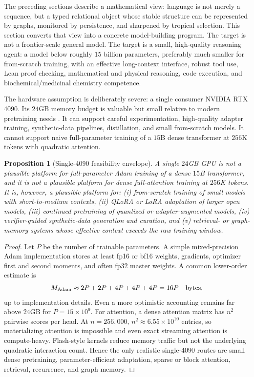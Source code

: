 \documentclass[11pt]{article}
\newtheorem{proposition}[definition]{Proposition}
\newcommand{\1}{\mathbf{1}}
\begin{document}
The preceding sections describe a mathematical view: language is not merely a sequence, but a typed relational object whose stable structure can be represented by graphs, monitored by persistence, and sharpened by tropical selection. This section converts that view into a concrete model-building program. The target is not a frontier-scale general model. The target is a small, high-quality reasoning agent: a model below roughly $15$ billion parameters, preferably much smaller for from-scratch training, with an effective long-context interface, robust tool use, Lean proof checking, mathematical and physical reasoning, code execution, and biochemical/medicinal chemistry competence.

The hardware assumption is deliberately severe: a single consumer NVIDIA RTX 4090. Its $24$GB memory budget is valuable but small relative to modern pretraining needs \cite{Nvidia4090}. It can support careful experimentation, high-quality adapter training, synthetic-data pipelines, distillation, and small from-scratch models. It cannot support naive full-parameter training of a $15$B dense transformer at $256$K tokens with quadratic attention.

\begin{proposition}[Single-4090 feasibility envelope]
\label{prop:4090-envelope}
A single $24$GB GPU is not a plausible platform for full-parameter Adam training of a dense $15$B transformer, and it is not a plausible platform for dense full-attention training at $256$K tokens. It is, however, a plausible platform for: (i) from-scratch training of small models with short-to-medium contexts, (ii) QLoRA or LoRA adaptation of larger open models, (iii) continued pretraining of quantized or adapter-augmented models, (iv) verifier-guided synthetic-data generation and curation, and (v) retrieval- or graph-memory systems whose \emph{effective} context exceeds the raw training window.
\end{proposition}

\begin{proof}
Let $P$ be the number of trainable parameters. A simple mixed-precision Adam implementation stores at least fp16 or bf16 weights, gradients, optimizer first and second moments, and often fp32 master weights. A common lower-order estimate is
\[
M_{\rm Adam}\approx 2P+2P+4P+4P+4P=16P \quad \text{bytes},
\]
up to implementation details. Even a more optimistic accounting remains far above $24$GB for $P=15\times 10^9$. For attention, a dense attention matrix has $n^2$ pairwise scores per head. At $n=256{,}000$, $n^2\approx 6.55\times 10^{10}$ entries, so materializing attention is impossible and even exact streaming attention is compute-heavy. Flash-style kernels reduce memory traffic but not the underlying quadratic interaction count. Hence the only realistic single-4090 routes are small dense pretraining, parameter-efficient adaptation, sparse or block attention, retrieval, recurrence, and graph memory. \qedhere
\end{proof}
\end{document}
